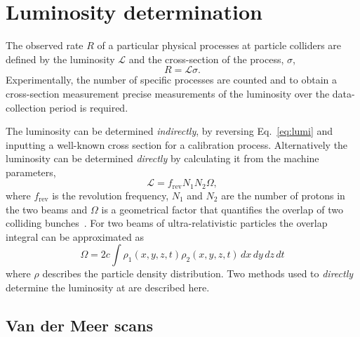 \section{Luminosity determination}
The observed rate $R$ of a particular physical processes at particle colliders are defined by the luminosity $\mathcal{L}$ and the cross-section of the process, $\sigma$, 
\begin{equation}
R = \mathcal{L}\sigma.
\label{eq:lumi}
\end{equation}
Experimentally, the number of specific processes are counted and to obtain a cross-section measurement precise measurements of the luminosity over the data-collection period is required.

The luminosity can be determined \emph{indirectly}, by reversing Eq.~\ref{eq:lumi} and inputting a well-known cross section for a calibration process. Alternatively the luminosity can be determined \emph{directly} by calculating it from the machine parameters,
\begin{equation}
\mathcal{L} = f_{\text{rev}}N_{1}N_{2}\Omega,
\end{equation}
where $f_{\text{rev}}$ is the revolution frequency, $N_{1}$ and $N_{2}$ are the number of protons in the two beams and $\Omega$ is a geometrical factor that quantifies the overlap of two colliding bunches~\cite{1748-0221-9-12-P12005}. 
For two beams of ultra-relativistic particles the overlap integral can be approximated as 
\begin{equation}
\Omega = 2c\int \rho_{1}(x,y,z,t)\rho_{2}(x,y,z,t)\,dx\,dy\,dz\,dt 
\end{equation}
where $\rho$ describes the particle density distribution.
Two methods used to \emph{directly} determine the luminosity at \lhcb are described here.



\subsection{Van der Meer scans}


